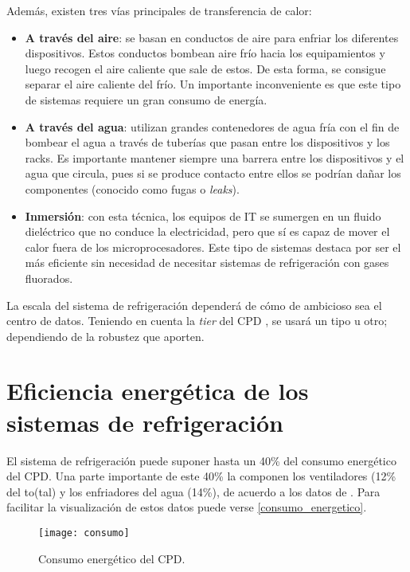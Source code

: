 Además, existen tres vías principales de transferencia de calor:

\begin{itemize}
    \item \textbf{A través del aire}: se basan en conductos de aire para enfriar los diferentes dispositivos. Estos conductos bombean aire frío hacia los equipamientos y luego recogen el aire caliente que sale de estos. De esta forma, se consigue separar el aire caliente del frío. Un importante inconveniente es que este tipo de sistemas requiere un gran consumo de energía.
    \item \textbf{A través del agua}: utilizan grandes contenedores de agua fría con el fin de bombear el agua a través de tuberías que pasan entre los dispositivos y los racks. Es importante mantener siempre una barrera entre los dispositivos y el agua que circula, pues si se produce contacto entre ellos se podrían dañar los componentes (conocido como fugas o \textit{leaks}).
    \item \textbf{Inmersión}: con esta técnica, los equipos de IT se sumergen en un fluido dieléctrico que no conduce la electricidad, pero que sí es capaz de mover el calor fuera de los microprocesadores. Este tipo de sistemas destaca por ser el más eficiente sin necesidad de necesitar sistemas de refrigeración con gases fluorados.
\end{itemize}

La escala del sistema de refrigeración dependerá de cómo de ambicioso sea el centro de datos. Teniendo en cuenta la \textit{tier} del CPD \cite{cofrico}, se usará un tipo u otro; dependiendo de la robustez que aporten.

\section{Eficiencia energética de los sistemas de refrigeración}

El sistema de refrigeración puede suponer hasta un 40\% del consumo energético del CPD. Una parte importante de este 40\% la componen los ventiladores (12\% del to(tal) y los enfriadores del agua (14\%), de acuerdo a los datos de \cite{ZHANG2021102253}. Para facilitar la visualización de estos datos puede verse \eqref{consumo_energetico}.

\begin{figure}
    \begin{center}
        \texttt{[image: consumo]}
        \caption{Consumo energético del CPD.}
        \label{consumo_energetico}
    \end{center}
\end{figure}

